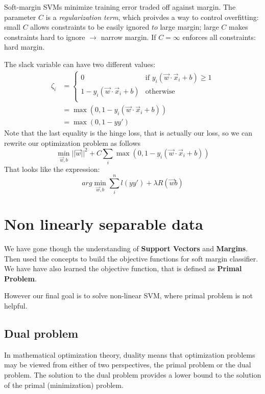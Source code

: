 Soft-margin SVMs minimize training error traded off against margin. The parameter \(C\) is a \emph{regularization term}, which proivdes a way to control overfitting: small \(C\) allows constraints to be easily ignored \(to\) large margin; large \(C\) makes constraints hard to ignore \(\to\) narrow margin. If \(C = \infty\) enforces all constraints: hard margin.

The slack variable can have two different values:
\begin{align}
    \zeta_i &= \begin{cases}
        0 &\text{if } y_i(\vec{w} \cdot \vec{x}_i + b) \geq 1\\
        1-y_i(\vec{w} \cdot \vec{x}_i + b) &\text{otherwise}\\
    \end{cases}\\
    &=\max(0, 1-y_i(\vec{w} \cdot \vec{x}_i + b))\\
    &=\max(0,1-yy')
\end{align}
Note that the last equality is the hinge loss, that is actually our loss, so we can rewrite our optimization problem as follows
\begin{equation}
    \min_{\vec{w},b} ||\vec{w}||^2 + C \sum_i \max(0,1-y_i(\vec{w} \cdot \vec{x}_i + b))
\end{equation}
That looks like the expression:
\begin{equation}
    arg \min_{\vec{w},b} \sum_i^n l(yy') + \lambda R(\vec{w} b)
\end{equation}

\section{Non linearly separable data}
We have gone though the understanding of \textbf{Support Vectors} and \textbf{Margins}. Then used the concepts to build the objective functions for soft margin classifier. We have have also learned the objective function, that is defined as \textbf{Primal Problem}.

However our final goal is to solve non-linear SVM, where primal problem is not helpful.

\subsection{Dual problem}
In mathematical optimization theory, duality means that optimization problems may be viewed from either of two perspectives, the primal problem or the dual problem. The solution to the dual problem provides a lower bound to the solution of the primal (minimization) problem.

